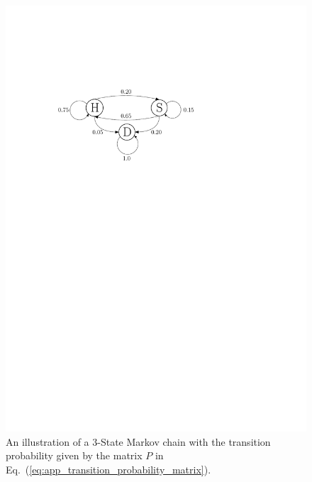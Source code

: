 \begin{figure}[bth]
	\centering
	\includegraphics[width=1.0\textwidth]{../figures/chapter5/figures/markov_chain.pdf}
	\caption[Illustration of a $3$-State Markov Chain]{An illustration of a $3$-State Markov chain with the transition probability given by the matrix $P$ in Eq.~(\ref{eq:app_transition_probability_matrix}).}
	\label{fig:app_markov_chain}
\end{figure}


